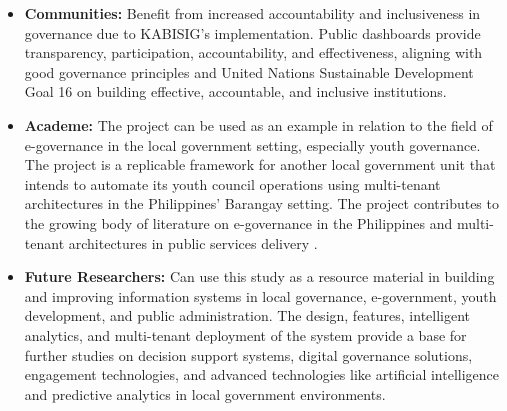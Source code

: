 \begin{itemize}
    \item \textbf{Communities:} Benefit from increased accountability and inclusiveness in governance due to KABISIG's implementation. Public dashboards provide transparency, participation, accountability, and effectiveness, aligning with good governance principles and United Nations Sustainable Development Goal 16 on building effective, accountable, and inclusive institutions.
    \item \textbf{Academe:} The project can be used as an example in relation to the field of e-governance in the local government setting, especially youth governance. The project is a replicable framework for another local government unit that intends to automate its youth council operations using multi-tenant architectures in the Philippines' Barangay setting. The project contributes to the growing body of literature on e-governance in the Philippines \cite{C, D, V, AM} and multi-tenant architectures in public services delivery \cite{AS}.
    \item \textbf{Future Researchers:} Can use this study as a resource material in building and improving information systems in local governance, e-government, youth development, and public administration. The design, features, intelligent analytics, and multi-tenant deployment of the system provide a base for further studies on decision support systems, digital governance solutions, engagement technologies, and advanced technologies like artificial intelligence and predictive analytics in local government environments.
\end{itemize}
\vspace{5mm}